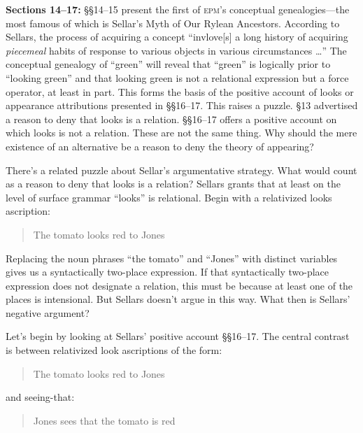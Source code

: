\documentclass[11pt]{article}
\begin{document}
\textbf{Sections 14--17:} §§14--15 present the first of \textsc{epm}'s conceptual genealogies---the most famous of which is Sellar's Myth of Our Rylean Ancestors. According to Sellars, the process of acquiring a concept ``invlove[s] a long history of acquiring \emph{piecemeal} habits of response to various objects in various circumstances \ldots'' The conceptual genealogy of ``green'' will reveal that ``green'' is logically prior to ``looking green'' and that looking green is not a relational expression but a force operator, at least in part. This forms the basis of the positive account of looks or appearance attributions presented in §§16--17. This raises a puzzle. §13 advertised a reason to deny that looks is a relation. §§16--17 offers a positive account on which looks is not a relation. These are not the same thing. Why should the mere existence of an alternative be a reason to deny the theory of appearing? 

There's a related puzzle about Sellar's argumentative strategy. What would count as a reason to deny that looks is a relation? Sellars grants that at least on the level of surface grammar ``looks'' is relational. Begin with a relativized looks ascription:
\begin{quote}
    The tomato looks red to Jones
\end{quote}
Replacing the noun phrases ``the tomato'' and ``Jones'' with distinct variables gives us a syntactically two-place expression. If that syntactically two-place expression does not designate a relation, this must be because at least one of the places is intensional. But Sellars doesn't argue in this way. What then is Sellars' negative argument?

Let's begin by looking at Sellars' positive account §§16--17. The central contrast is between relativized look ascriptions of the form:
\begin{quote}
    The tomato looks red to Jones
\end{quote}
and seeing-that:
\begin{quote}
    Jones sees that the tomato is red
\end{quote}
\end{document}
